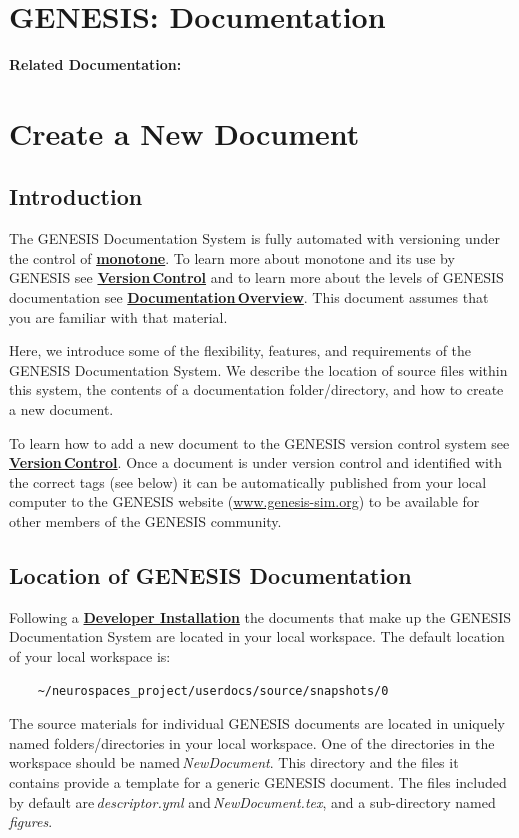 \documentclass[12pt]{article}
\begin{document}
\section*{GENESIS: Documentation}

{\bf Related Documentation:}

\section*{Create a New Document}

\subsection*{Introduction}

The GENESIS Documentation System is fully automated with versioning under the control of \href{http://monotone.ca/}{\bf monotone}. To learn more about monotone and its use by GENESIS see \href{../version-control/version-control.tex}{\bf Version\,Control} and to learn more about the levels of GENESIS documentation see \href{../documentation-overview/documentation-overview.tex}{\bf Documentation\,Overview}. This document assumes that you are familiar with that material.

Here, we introduce some of the flexibility, features, and requirements of the GENESIS Documentation System. We describe the location of source files within this system, the contents of a documentation folder/directory, and how to create a new document.

To learn how to add a new document to the GENESIS version control system see \href{../version-control/version-control.tex}{\bf Version\,Control}. Once a document is under version control and identified with the correct tags (see below) it can be automatically published from your local computer to the GENESIS website (\href{http://www.genesis-sim.org/}{www.genesis-sim.org}) to be available for other members of the GENESIS community.

\subsection*{Location of GENESIS Documentation}

Following a \href{../genesis-installation/genesis-installation.tex}{\bf Developer Installation} the documents that make up the GENESIS Documentation System are located in your local workspace. The default location of your local workspace is:
\begin{verbatim}
    ~/neurospaces_project/userdocs/source/snapshots/0
\end{verbatim}
The source materials for individual GENESIS documents are located in uniquely named folders/directories in your local workspace. One of the directories in the workspace should be named\,{\it NewDocument}. This directory and the files it contains provide a template for a generic GENESIS document. The files included by default are\,{\it descriptor.yml} and\,{\it NewDocument.tex}, and a sub-directory named\,{\it figures}.
\end{document}
